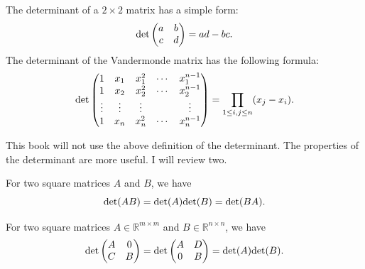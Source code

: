 


The determinant of a $2\times 2$ matrix has a simple form:
\begin{equation}\label{eq::det-2X2}
\textup{det}\begin{pmatrix}
a & b \\
c& d
\end{pmatrix}
= ad - bc.
\end{equation}
The determinant of the Vandermonde matrix has the following formula:
\begin{equation}
\label{eq::det-Vandermonde}
\textup{det}\begin{pmatrix}
1& x_1 & x_1^2 & \cdots & x_1^{n-1} \\
1& x_2 & x_2^2 & \cdots & x_2^{n-1} \\
\vdots & \vdots & \vdots & & \vdots \\
1&x_n & x_n^2 & \cdots & x_n^{n-1}
\end{pmatrix} 
= \prod_{1\leq i, j \leq n} (x_j - x_i).
\end{equation}


This book will not use the above definition of the determinant. 
The properties of the determinant are more useful. I will review two.

\begin{proposition}
For two square matrices $A$ and $B$, we have
$$
\textup{det}(AB) = \textup{det}(A) \textup{det}(B)  = \textup{det}(BA). 
$$
\end{proposition}



\begin{proposition}
For two square matrices $A \in \mathbb{R}^{m\times m}$ and $B \in \mathbb{R}^{n \times n}$, we have
$$
\textup{det}
\begin{pmatrix}
A & 0 \\
C& B
\end{pmatrix}
= 
\textup{det}
\begin{pmatrix}
A & D \\
0& B
\end{pmatrix}
=
\textup{det}(A) \textup{det}(B) . 
$$
\end{proposition}




